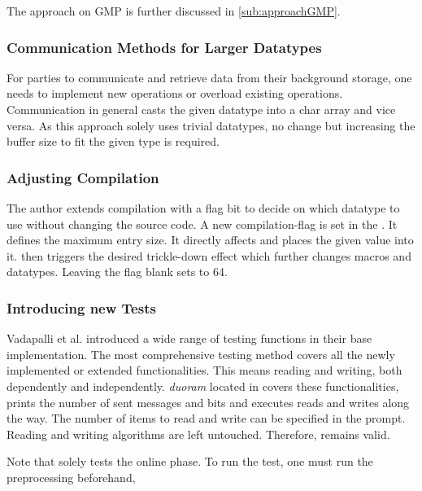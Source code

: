 The approach on GMP is further discussed in \ref{sub:approachGMP}.

\subsubsection*{Communication Methods for Larger Datatypes}\label{subsub:communicationMethodsForLargerDatatypes}
For parties to communicate and retrieve data from their background storage, one needs to implement new operations or overload existing operations.
Communication in general casts the given datatype into a char array and vice versa.
As this approach solely uses trivial datatypes, no change but increasing the buffer size to fit the given type is required.

\subsubsection*{Adjusting Compilation}\label{subsub:adjustingCompilation}
The author extends compilation with a flag bit to decide on which datatype to use without changing the source code.
A new compilation-flag  is set in the .
It defines the maximum entry size.
It directly affects  and places the given value into it.
 then triggers the desired trickle-down effect which further changes macros and datatypes.
Leaving the flag blank sets  to 64.

\subsubsection*{Introducing new Tests}\label{subsub:incNewTests}
Vadapalli et al. introduced a wide range of testing functions in their base implementation.
The most comprehensive testing method covers all the newly implemented or extended functionalities.
This means reading and writing, both dependently and independently.
\textit{duoram} located in  covers these functionalities, prints the number of sent messages and bits and executes reads and writes along the way.
The number of items to read and write can be specified in the prompt.
Reading and writing algorithms are left untouched.
Therefore,  remains valid.

Note that  solely tests the online phase.
To run the test, one must run the preprocessing beforehand,